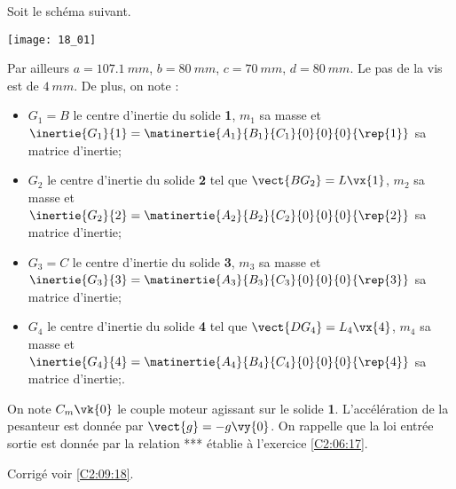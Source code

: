 \normalfalse \difficilefalse \tdifficiletrue
\correctionfalse


\setcounter{question}{0}
\ifcorrection
\else
{}
\fi

\ifprof
\else

Soit le schéma suivant. 
\begin{center}
\texttt{[image: 18\_01]}
\end{center}


Par ailleurs $a=\SI{107,1}{mm}$, $b=\SI{80}{mm}$, $c=\SI{70}{mm}$, $d=\SI{80}{mm}$. Le pas de la vis est de $\SI{4}{mm}$. De plus, on note :
\begin{itemize}
\item $G_1=B$ le centre d'inertie du solide \textbf{1}, $m_1$ sa masse et $\inertie{G_1}{1}=\matinertie{A_1}{B_1}{C_1}{0}{0}{0}{\rep{1}}$ sa matrice d'inertie;
\item $G_2$ le centre d'inertie du solide \textbf{2} tel que $\vect{BG_2}=L\vx{1}$, $m_2$ sa masse et $\inertie{G_2}{2}=\matinertie{A_2}{B_2}{C_2}{0}{0}{0}{\rep{2}}$ sa matrice d'inertie;
\item $G_3=C$ le centre d'inertie du solide \textbf{3}, $m_3$ sa masse et $\inertie{G_3}{3}=\matinertie{A_3}{B_3}{C_3}{0}{0}{0}{\rep{3}}$ sa matrice d'inertie;
\item $G_4$ le centre d'inertie du solide \textbf{4} tel que $\vect{DG_4}=L_4\vx{4}$, $m_4$ sa masse et $\inertie{G_4}{4}=\matinertie{A_4}{B_4}{C_4}{0}{0}{0}{\rep{4}}$ sa matrice d'inertie;.
\end{itemize}
On note $C_m\vk{0}$ le couple moteur agissant sur le solide \textbf{1}. L'accélération de la pesanteur est donnée par $\vect{g}=-g\vy{0}$.
On rappelle que la loi entrée sortie est donnée par la relation *** établie à l'exercice \ref{C2:06:17}.

\fi

\ifprof
\else
\fi

\ifprof
\else
\fi

\ifprof
\else
\fi

\ifprof
\else
\fi

\ifprof
\else
\fi

\ifprof
\else
\begin{flushright}
\footnotesize{Corrigé  voir \ref{C2:09:18}.}
\end{flushright}%
\fi